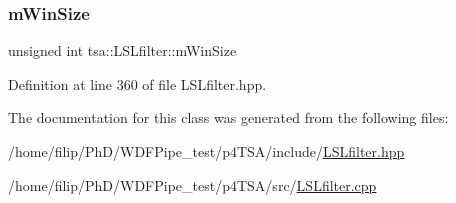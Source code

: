 \mbox{\label{classtsa_1_1_l_s_lfilter_a015aba5b8378277ee5cda011ba6b4fe1}} 
\subsubsection{\texorpdfstring{m\+Win\+Size}{mWinSize}}
{\footnotesize\ttfamily unsigned int tsa\+::\+L\+S\+Lfilter\+::m\+Win\+Size\hspace{0.3cm}{\ttfamily [private]}}



Definition at line 360 of file L\+S\+Lfilter.\+hpp.



The documentation for this class was generated from the following files\+:\begin{DoxyCompactItemize}
\item 
/home/filip/\+Ph\+D/\+W\+D\+F\+Pipe\+\_\+test/p4\+T\+S\+A/include/\hyperlink{_l_s_lfilter_8hpp}{L\+S\+Lfilter.\+hpp}\item 
/home/filip/\+Ph\+D/\+W\+D\+F\+Pipe\+\_\+test/p4\+T\+S\+A/src/\hyperlink{_l_s_lfilter_8cpp}{L\+S\+Lfilter.\+cpp}\end{DoxyCompactItemize}
